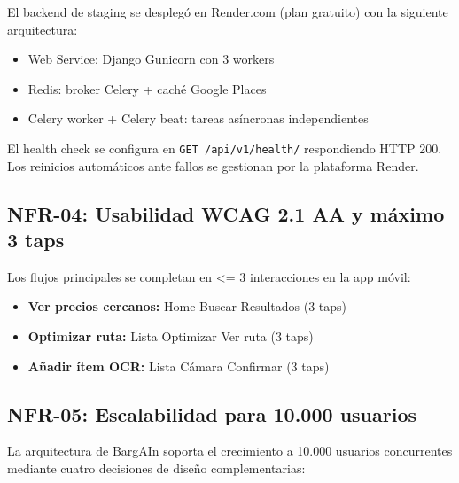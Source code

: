 El backend de staging se despleg\'o en Render.com (plan gratuito) con la siguiente arquitectura:
\begin{itemize}
  \item Web Service: Django Gunicorn con 3 workers
  \item Redis: broker Celery + cach\'e Google Places
  \item Celery worker + Celery beat: tareas as\'incronas independientes
\end{itemize}

El health check se configura en \texttt{GET /api/v1/health/} respondiendo HTTP 200. Los reinicios
autom\'aticos ante fallos se gestionan por la plataforma Render.

\subsection{NFR-04: Usabilidad WCAG 2.1 AA y m\'aximo 3 taps}\label{subsec:nfr04}

Los flujos principales se completan en \textless{}= 3 interacciones en la app m\'ovil:

\begin{itemize}
  \item \textbf{Ver precios cercanos:} Home \textrightarrow{} Buscar \textrightarrow{} Resultados
    (3 taps)
  \item \textbf{Optimizar ruta:} Lista \textrightarrow{} Optimizar \textrightarrow{} Ver ruta
    (3 taps)
  \item \textbf{A\~nadir \'item OCR:} Lista \textrightarrow{} C\'amara \textrightarrow{} Confirmar
    (3 taps)
\end{itemize}

\subsection{NFR-05: Escalabilidad para 10.000 usuarios}\label{subsec:nfr05}

La arquitectura de BargAIn soporta el crecimiento a 10.000 usuarios concurrentes mediante cuatro
decisiones de dise\~no complementarias:

